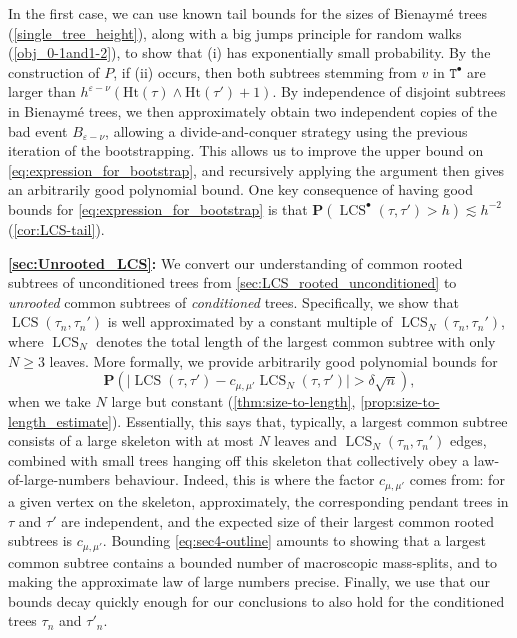 \documentclass[11pt,reqno]{amsart}
\newcommand{\1}{\mathbf{1}}
\newcommand{\0}{\mathbf{0}}
\newcommand{\ttT}{\mathtt{T}}
\newcommand{\prob}{\mathbf{P}}
\newcommand{\Ht}{\mathrm{Ht}}
\newcommand{\LCS}{\operatorname{LCS}}
\begin{document}
In the first case, we can use known tail bounds for the sizes of Bienaym\'{e} trees (\cref{single_tree_height}), along with a big jumps principle for random walks (\cref{obj_0-1and1-2}), to show that (i) has exponentially small probability. By the construction of $P$, if (ii) occurs, then both subtrees stemming from $v$ in $\ttT^\bullet$ are larger than $h^{\varepsilon-\nu}(\Ht(\tau) \wedge \Ht(\tau')+1)$. By independence of disjoint subtrees in Bienaym\'{e} trees, we then approximately obtain two independent copies of the bad event $B_{\varepsilon-\nu}$, allowing a divide-and-conquer strategy using the previous iteration of the bootstrapping. This allows us to improve the upper bound on \eqref{eq:expression_for_bootstrap}, and recursively applying the argument then gives an arbitrarily good polynomial bound. One key consequence of having good bounds for \eqref{eq:expression_for_bootstrap} is that $\prob(\LCS^\bullet(\tau,\tau') > h) \lesssim h^{-2}$ (\cref{cor:LCS-tail}).
\medskip

{\bf \cref{sec:Unrooted_LCS}:} We convert our understanding of common rooted subtrees of unconditioned trees from \cref{sec:LCS_rooted_unconditioned} to \emph{unrooted} common subtrees of \emph{conditioned} trees. Specifically, we show that $\LCS(\tau_n,\tau_n')$ is well approximated by a constant multiple of $\LCS_N(\tau_n,\tau_n')$, where $\LCS_N$ denotes the total length of the largest common subtree with only $N\geq 3$ leaves. More formally, we provide arbitrarily good polynomial bounds for 
\begin{equation}\label{eq:sec4-outline}
\prob\left( \big|\LCS(\tau,\tau') - c_{\mu,\mu'}\LCS_N(\tau,\tau')\big| > \delta \sqrt{n} \right),
\end{equation}
when we take $N$ large but constant (\cref{thm:size-to-length}, \cref{prop:size-to-length_estimate}). Essentially, this says that, typically, a largest common subtree consists of a large skeleton with at most $N$ leaves and $\LCS_N(\tau_n,\tau_n')$ edges, combined with small trees hanging off this skeleton that collectively obey a law-of-large-numbers behaviour. Indeed, this is where the factor $c_{\mu,\mu'}$ comes from: for a given vertex on the skeleton, approximately, the corresponding pendant trees in $\tau$ and $\tau'$ are independent, and the expected size of their largest common rooted subtrees is $c_{\mu,\mu'}$. Bounding \eqref{eq:sec4-outline} amounts to showing that a largest common subtree contains a bounded number of macroscopic mass-splits, and to making the approximate law of large numbers precise. Finally, we use that our bounds decay quickly enough for our conclusions to also hold for the conditioned trees $\tau_n$ and $\tau'_n$.
\medskip
\end{document}
